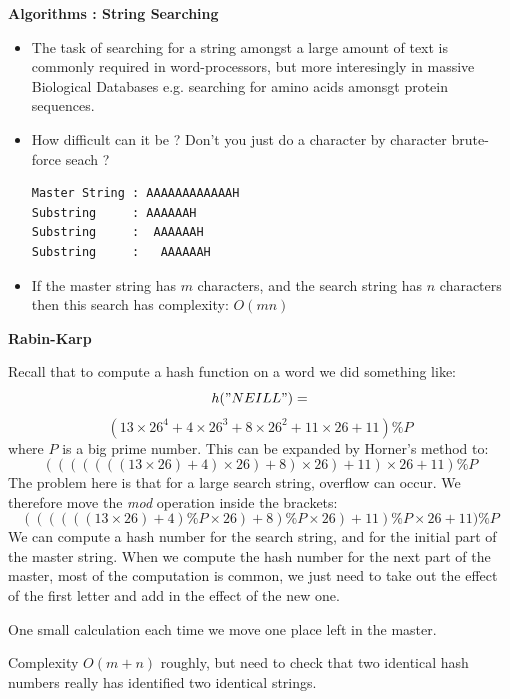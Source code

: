 \newpage
{\samepage
\begin{center}
{\Large{\bf Algorithms : String Searching}}
\end{center}
\begin{itemize}
\item The task of searching for a string amongst a large
amount of text is commonly required in word-processors,
but more interesingly in massive Biological Databases e.g.
searching for amino acids amonsgt protein sequences.
\item How difficult can it be ? Don't you just do a character by
character brute-force seach ?
\begin{verbatim}
Master String : AAAAAAAAAAAAH
Substring     : AAAAAAH
Substring     :  AAAAAAH
Substring     :   AAAAAAH
\end{verbatim}
\item If the master string has $m$ characters, and the search string
has $n$ characters then this search has complexity:
$O(mn)$
\end{itemize}
}

\newpage
{\samepage
\begin{center}
{\Large{\bf Rabin-Karp}}
\end{center}
{\small
Recall that to compute a hash function on a word we did something like:
\[
h("NEILL") =
\]
{\small
\[
(13\times26^4 + 4\times26^3 + 8\times26^2 + 11\times26 + 11) \% P
\]
}
where $P$ is a big prime number.
This can be expanded by Horner's method to:
{\small
\[
(((((((13\times26)+ 4)\times26) + 8)\times26) + 11)\times26 + 11) \% P
\]
}
The problem here is that for a large search string, overflow can occur.
We therefore move the {\it mod} operation inside the brackets:
{\small
\[
((((((13\times26)+ 4)\%P \times26) + 8)\%P \times26) + 11)\%P \times26 + 11) \% P
\]
}
We can compute a hash number for the search string, and for the initial
part of the master string.
When we compute the hash number for the next part of the master, most
of the computation is common, we just need to take out the effect of the first letter and add in the effect of the new one.

One small calculation each time we move one place left in the master.

Complexity $O(m+n)$ roughly, but need to check that two identical hash
numbers really has identified two identical strings.
}}

